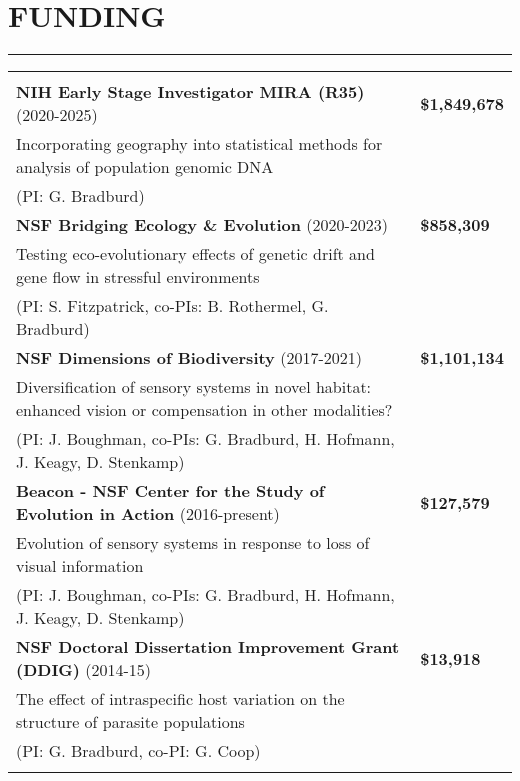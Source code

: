 \documentclass{article}
\begin{document}
\section*{FUNDING}
\vspace{-0.6cm}
\rule{470pt}{0.4pt}
\begin{tabular}{>{\everypar{\hangindent1cm}}p{}p{}}
\hfill\\
%
\textbf{NIH Early Stage Investigator MIRA (R35)} (2020-2025) & \hfill \textbf{\$1,849,678} \\
\hspace{4.5mm} Incorporating geography into statistical methods for analysis of population genomic DNA\\
\hspace{4.5mm}(PI: G. Bradburd)\\ \vspace{-0.1cm}
%
\textbf{NSF Bridging Ecology \& Evolution} (2020-2023) & \hfill \textbf{\$858,309} \\
\hspace{4.5mm} Testing eco-evolutionary effects of genetic drift and gene flow in stressful environments\\
\hspace{4.5mm}(PI: S. Fitzpatrick, co-PIs: B. Rothermel, G. Bradburd)\\ \vspace{-0.1cm}
%
\textbf{NSF Dimensions of Biodiversity} (2017-2021) & \hfill \textbf{\$1,101,134} \\
\hspace{4.5mm}Diversification of sensory systems in novel habitat: enhanced vision or compensation in other modalities?\\
\hspace{4.5mm}(PI: J. Boughman, co-PIs: G. Bradburd, H. Hofmann, J. Keagy, D. Stenkamp)\\ \vspace{-0.1cm}
%
\textbf{Beacon - NSF Center for the Study of Evolution in Action} (2016-present) & \hfill \textbf{\$127,579}\\
\hspace{4.5mm}Evolution of sensory systems in response to loss of visual information\\
\hspace{4.5mm}(PI: J. Boughman, co-PIs: G. Bradburd, H. Hofmann, J. Keagy, D. Stenkamp)\\ \vspace{-0.1cm}
%
\textbf{NSF Doctoral Dissertation Improvement Grant (DDIG)} (2014-15) & \hfill \textbf{\$13,918}\\
\hspace{4.5mm}The effect of intraspecific host variation on the structure of parasite populations\\
\hspace{4.5mm}(PI: G. Bradburd, co-PI: G. Coop)\\ \vspace{-0.1cm}
\end{tabular}
%
\end{document}
